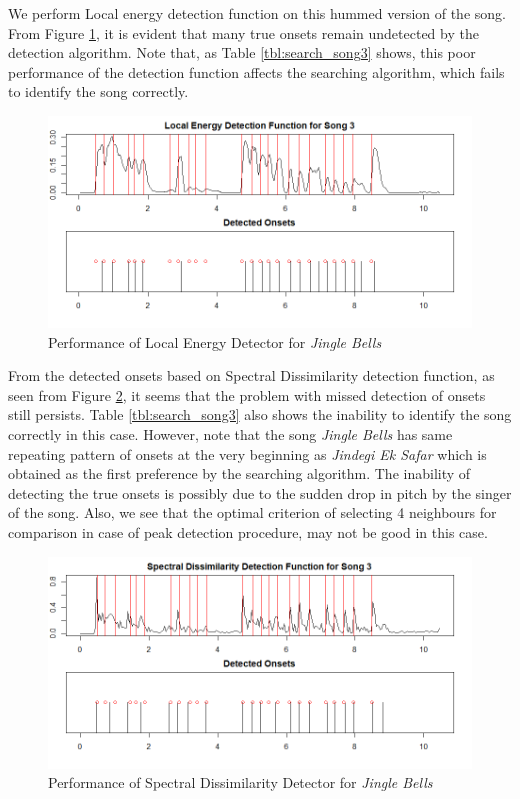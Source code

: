 \documentclass[10pt]{article}
\begin{document}
We perform Local energy detection function on this hummed version of the song. From Figure \ref{fig:energy_song3}, it is evident that many true onsets remain undetected by the detection algorithm. Note that, as Table \ref{tbl:search_song3} shows, this poor performance of the detection function affects the searching algorithm, which fails to identify the song correctly.

\begin{figure}
    \centering
    \includegraphics[width = \textwidth]{energy_song3.png}
    \caption{Performance of Local Energy Detector for \textit{Jingle Bells}}
    \label{fig:energy_song3}
\end{figure}

From the detected onsets based on Spectral Dissimilarity detection function, as seen from Figure \ref{fig:spectral_song3}, it seems that the problem with missed detection of onsets still persists. Table \ref{tbl:search_song3} also shows the inability to identify the song correctly in this case. However, note that the song \textit{Jingle Bells} has same repeating pattern of onsets at the very beginning as \textit{Jindegi Ek Safar} which is obtained as the first preference by the searching algorithm. The inability of detecting the true onsets is possibly due to the sudden drop in pitch by the singer of the song. Also, we see that the optimal criterion of selecting 4 neighbours for comparison in case of peak detection procedure, may not be good in this case.

\begin{figure}
    \centering
    \includegraphics[width = \textwidth]{spectral_song3.png}
    \caption{Performance of Spectral Dissimilarity Detector for \textit{Jingle Bells}}
    \label{fig:spectral_song3}
\end{figure}
\end{document}
